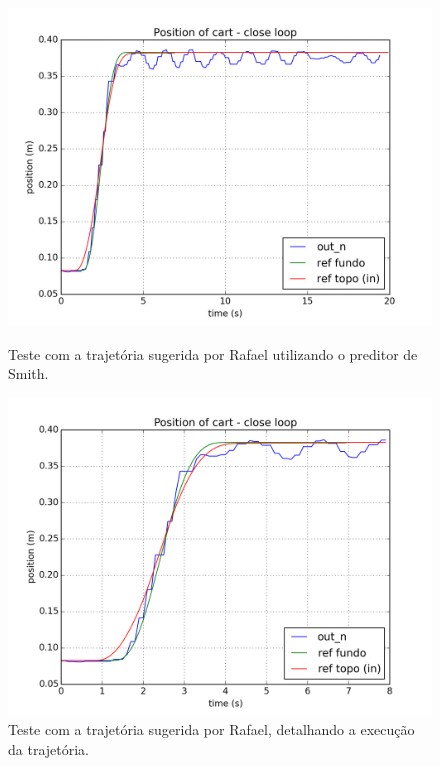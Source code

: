 \begin{figure}[!ht]
\centering
\begin{minipage}{.45\textwidth}
\centering
\includegraphics[width=1\textwidth]{figs/resultados/experimento/closed_loop_trajetoria_rafael}
\caption{Teste com a trajetória sugerida por Rafael utilizando o preditor de Smith. \label{experimentoRafael}}
\end{minipage}
\hspace{0.1cm}
\begin{minipage}{.45\textwidth}
\centering
\includegraphics[width=1\textwidth]{figs/resultados/experimento/closed_loop_trajetoria_rafael_detalhe}
\caption{Teste com a trajetória sugerida por Rafael, detalhando a execução da trajetória. \label{experimentoRafaelDetalhe}}
\end{minipage}
\end{figure} 

